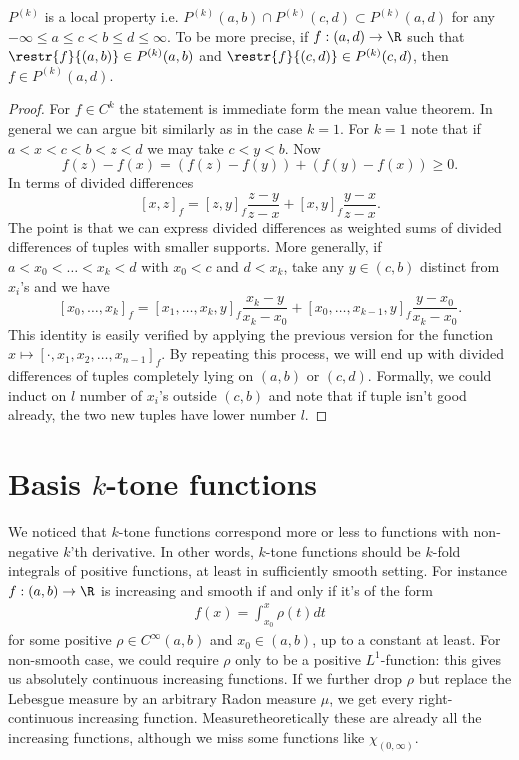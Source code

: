 \begin{prop}
	$P^{(k)}$ is a local property i.e. $P^{(k)}(a, b) \cap P^{(k)}(c, d) \subset P^{(k)}(a, d)$ for any $-\infty \leq a \leq c < b \leq d \leq \infty$. To be more precise, if $f : (a, d) \to \R$ such that $\restr{f}{(a, b)} \in P^{(k)}(a, b)$ and $\restr{f}{(c, d)} \in P^{(k)}(c, d)$, then $f \in P^{(k)}(a, d)$.
\end{prop}
\begin{proof}
	For $f \in C^{k}$ the statement is immediate form the mean value theorem. In general we can argue bit similarly as in the case $k = 1$. For $k = 1$ note that if $a < x < c < b < z < d$ we may take $c < y < b$. Now
	\[
		f(z) - f(x) = (f(z) - f(y)) + (f(y) - f(x)) \geq 0.
	\]
	In terms of divided differences
	\[
		[x, z]_{f} = [z, y]_{f} \frac{z - y}{z - x} + [x, y]_{f} \frac{y - x}{z - x}.
	\]
	The point is that we can express divided differences as weighted sums of divided differences of tuples with smaller supports. More generally, if $a < x_{0} < \ldots < x_{k} < d$ with $x_{0} < c$ and $d < x_{k}$, take any $y \in (c, b)$ distinct from $x_{i}$'s and we have
	\[
		[x_{0}, \ldots, x_{k}]_{f} = [x_{1}, \ldots, x_{k}, y]_{f} \frac{x_{k} - y}{x_{k} - x_{0}} + [x_{0}, \ldots, x_{k - 1}, y]_{f} \frac{y - x_{0}}{x_{k} - x_{0}}.
	\]
	This identity is easily verified by applying the previous version for the function $x \mapsto [\cdot, x_{1}, x_{2}, \ldots, x_{n - 1}]_{f}$. By repeating this process, we will end up with divided differences of tuples completely lying on $(a, b)$ or $(c, d)$. Formally, we could induct on $l$ number of $x_{i}$'s outside $(c, b)$ and note that if tuple isn't good already, the two new tuples have lower number $l$.
\end{proof}

\section{Basis $k$-tone functions}

We noticed that $k$-tone functions correspond more or less to functions with non-negative $k$'th derivative. In other words, $k$-tone functions should be $k$-fold integrals of positive functions, at least in sufficiently smooth setting. For instance $f : (a, b) \to \R$ is increasing and smooth if and only if it's of the form
\begin{align}\label{increasing_repr}
	f(x) = \int_{x_{0}}^{x} \rho(t) dt
\end{align}
for some positive $\rho \in C^{\infty}(a, b)$ and $x_{0} \in (a, b)$, up to a constant at least. For non-smooth case, we could require $\rho$ only to be a positive $L^{1}$-function: this gives us absolutely continuous increasing functions. If we further drop $\rho$ but replace the Lebesgue measure by an arbitrary Radon measure $\mu$, we get every right-continuous increasing function. Measuretheoretically these are already all the increasing functions, although we miss some functions like $\chi_{(0, \infty)}$.

